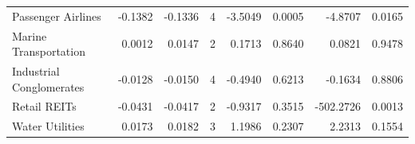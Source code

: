 \begin{table}
\begin{tabular}{lrrrrrrr}
Passenger Airlines & -0.1382 & -0.1336 & 4 & -3.5049 & 0.0005 & -4.8707 & 0.0165 \\
Marine Transportation & 0.0012 & 0.0147 & 2 & 0.1713 & 0.8640 & 0.0821 & 0.9478 \\
Industrial Conglomerates & -0.0128 & -0.0150 & 4 & -0.4940 & 0.6213 & -0.1634 & 0.8806 \\
Retail REITs & -0.0431 & -0.0417 & 2 & -0.9317 & 0.3515 & -502.2726 & 0.0013 \\
Water Utilities & 0.0173 & 0.0182 & 3 & 1.1986 & 0.2307 & 2.2313 & 0.1554 \\
\bottomrule
\end{tabular}
\end{table}
